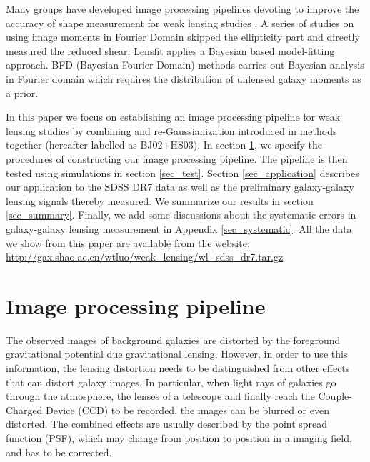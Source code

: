 \documentclass[apj]{emulateapj}
\begin{document}
Many groups have developed image processing pipelines devoting to
improve the accuracy of shape measurement for weak lensing studies
\citep{Kaiser1995, Bertin1996, Maoli2000, Rhodes2000, vanWaerbeke2001,
  Bernstein2002,Bridle2002, Refregier2003, Bacon2003, Hirata2003,
  Heymans2005, Zhang2010, Zhang2011,Bernstein2014, Zhang2015}.  A
series of studies on using image moments in Fourier
Domain\citep{Zhang2010, Zhang2011, Zhang2015} skipped the ellipticity
part and directly measured the reduced shear.  Lensfit
\citep{Miller2007, Miller2013, Kitching2008} applies a Bayesian based
model-fitting approach. BFD (Bayesian Fourier Domain)
methods \citep{Bernstein2014} carries out Bayesian analysis in Fourier
domain which requires the distribution of unlensed galaxy moments as a
prior.


In this paper we focus on establishing an image processing pipeline
for weak lensing studies by combining \citet[herefater
BJ02]{Bernstein2002} and re-Gaussianization introduced in
\citet[hereafter HS03]{Hirata2003} methods together (hereafter
labelled as BJ02+HS03). In section \ref{sec_method}, we specify the
procedures of constructing our image processing pipeline.  The
pipeline is then tested using simulations in section \ref{sec_test}.
Section \ref{sec_application} describes our application to the SDSS
DR7 data as well as the preliminary galaxy-galaxy lensing signals
thereby measured.  We summarize our results in section
\ref{sec_summary}.  Finally, we add some discussions about the
systematic errors in galaxy-galaxy lensing measurement in Appendix
\ref{sec_systematic}. All the data we show from this paper are
available from the website:
\href{url}{http://gax.shao.ac.cn/wtluo/weak\_lensing/wl\_sdss\_dr7.tar.gz}


\section{Image processing pipeline}
\label{sec_method}

The observed images of background galaxies are distorted by the
foreground gravitational potential due gravitational lensing.
However, in order to use this information, the lensing distortion 
needs to be distinguished from other effects that can distort 
galaxy images.  In particular, when light rays of galaxies go through the 
atmosphere, the lenses of a telescope and finally reach the
Couple-Charged Device (CCD) to be  recorded,  the images
can be blurred or even distorted. The combined effects are 
usually described by the point spread function (PSF), which may 
change from position to position in a imaging field, and has to be 
corrected. 
\end{document}
